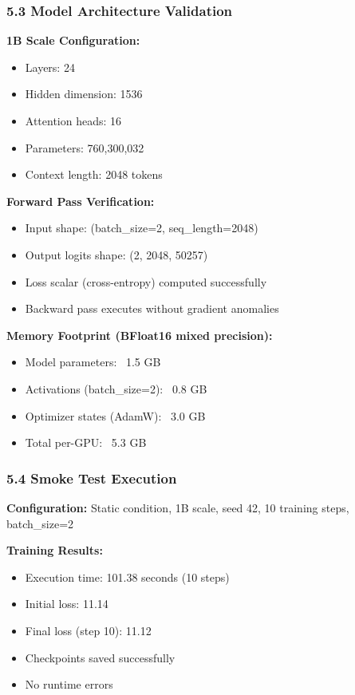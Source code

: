 \subsubsection{5.3 Model Architecture Validation}

\textbf{1B Scale Configuration:}
\begin{itemize}
\item Layers: 24
\item Hidden dimension: 1536
\item Attention heads: 16
\item Parameters: 760,300,032
\item Context length: 2048 tokens
\end{itemize}

\textbf{Forward Pass Verification:}
\begin{itemize}
\item Input shape: (batch_size=2, seq_length=2048)
\item Output logits shape: (2, 2048, 50257)
\item Loss scalar (cross-entropy) computed successfully
\item Backward pass executes without gradient anomalies
\end{itemize}

\textbf{Memory Footprint (BFloat16 mixed precision):}
\begin{itemize}
\item Model parameters: ~1.5 GB
\item Activations (batch_size=2): ~0.8 GB
\item Optimizer states (AdamW): ~3.0 GB
\item Total per-GPU: ~5.3 GB
\end{itemize}

\subsubsection{5.4 Smoke Test Execution}

\textbf{Configuration:} Static condition, 1B scale, seed 42, 10 training steps, batch_size=2

\textbf{Training Results:}
\begin{itemize}
\item Execution time: 101.38 seconds (10 steps)
\item Initial loss: 11.14
\item Final loss (step 10): 11.12
\item Checkpoints saved successfully
\item No runtime errors
\end{itemize}

